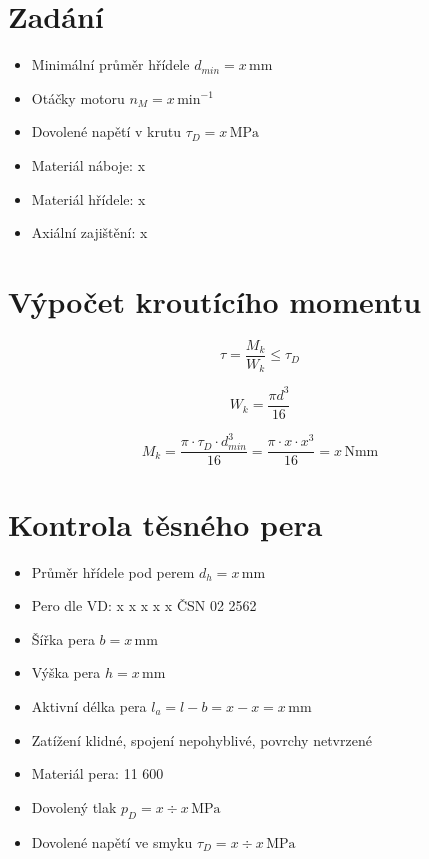 \documentclass[a4paper,11pt]{article}
\newcommand{\motorN}{x} %
\newcommand{\dmin}{x} %
\newcommand{\AxZa}{x} %
\newcommand{\MatNa}{x} %
\newcommand{\MatHr}{x} %
\newcommand{\tauDovHridel}{x} %
\newcommand{\Mk}{x} %
\newcommand{\dhr}{x} %
\newcommand{\bPera}{x} %
\newcommand{\hPera}{x} %
\newcommand{\lPera}{x} %
\newcommand{\laPera}{x} %
\newcommand{\pDMin}{x} %
\newcommand{\pDMax}{x} %
\newcommand{\tauDMin}{x} %
\newcommand{\tauDMax}{x} %
\begin{document}
\setcounter{page}{2}

\tableofcontents
\newpage

\section{Zadání}

\begin{itemize}
\item Minimální průměr hřídele $d_{min} = \dmin{} \mathrm{\,mm}$
\item Otáčky motoru $n_M = \motorN{} \mathrm{\,min}^{-1}$
\item Dovolené napětí v krutu $\tau_D = \tauDovHridel{} \mathrm{\,MPa}$
\item Materiál náboje: \MatNa{}
\item Materiál hřídele: \MatHr{}
\item Axiální zajištění: \AxZa{}
\end{itemize}

\section{Výpočet kroutícího momentu}

\[ \tau = \frac{M_k}{W_k} \leq \tau_D \]

\[ W_k = \frac{\pi d^3}{16} \]

\[ M_{k} = \frac{\pi \cdot \tau_D \cdot d_{min}^3}{16} = \frac{\pi \cdot \tauDovHridel{} \cdot \dmin{}^3}{16} = \Mk{} \mathrm{\,Nmm} \]

\section{Kontrola těsného pera}

\begin{itemize}
\item Průměr hřídele pod perem $d_h = \dhr{} \mathrm{\,mm}$
\item Pero dle VD: \bPera{} x \hPera{} x \lPera{} ČSN 02 2562
\item Šířka pera $b = \bPera{} \mathrm{\,mm}$
\item Výška pera $h = \hPera{} \mathrm{\,mm}$
\item Aktivní délka pera $l_a = l - b = \lPera{} - \bPera{} = \laPera{} \mathrm{\,mm}$
\item Zatížení klidné, spojení nepohyblivé, povrchy netvrzené
\item Materiál pera: 11 600
\item Dovolený tlak $p_D = \pDMin{} \div \pDMax{} \mathrm{\,MPa}$
\item Dovolené napětí ve smyku $\tau_D = \tauDMin{} \div \tauDMax{} \mathrm{\,MPa}$
\end{itemize}
\end{document}
